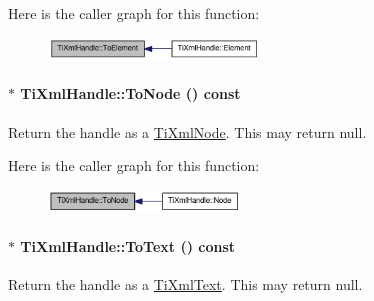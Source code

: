 Here is the caller graph for this function:\nopagebreak
\begin{figure}[H]
\begin{center}
\leavevmode
\includegraphics[width=159pt]{class_ti_xml_handle_abc6e7ed383a5fe1e52b0c0004b457b9e_icgraph}
\end{center}
\end{figure}
\hypertarget{class_ti_xml_handle_af678e5088e83be67baf76f699756f2c3}{
\paragraph[{ToNode}]{$\ast$ TiXmlHandle::ToNode () const}\hfill}
\label{class_ti_xml_handle_af678e5088e83be67baf76f699756f2c3}
Return the handle as a \hyperlink{class_ti_xml_node}{TiXmlNode}. This may return null. 

Here is the caller graph for this function:\nopagebreak
\begin{figure}[H]
\begin{center}
\leavevmode
\includegraphics[width=145pt]{class_ti_xml_handle_af678e5088e83be67baf76f699756f2c3_icgraph}
\end{center}
\end{figure}
\hypertarget{class_ti_xml_handle_a4ac53a652296203a5b5e13854d923586}{
\paragraph[{ToText}]{$\ast$ TiXmlHandle::ToText () const}\hfill}
\label{class_ti_xml_handle_a4ac53a652296203a5b5e13854d923586}
Return the handle as a \hyperlink{class_ti_xml_text}{TiXmlText}. This may return null. 

